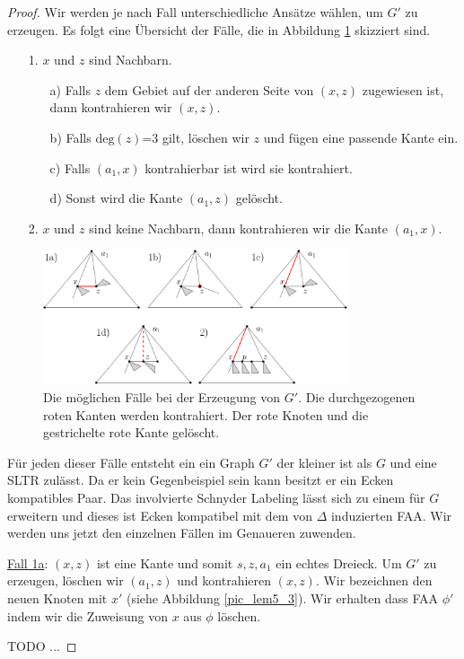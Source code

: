 \begin{proof}
Wir werden je nach Fall unterschiedliche Ansätze wählen, um $G'$ zu erzeugen. Es folgt eine Übersicht der Fälle, die in Abbildung \ref{pic_lem5_2} skizziert sind.

\begin{itemize}
\item [1.] $x$ und $z$ sind Nachbarn.
	\begin{itemize}
	\item [a)] Falls $z$ dem Gebiet auf der anderen Seite von $(x,z)$ zugewiesen ist, dann kontrahieren wir $(x,z)$.
	\item [b)] Falls $\text{deg}(z)$=3 gilt, löschen wir $z$ und fügen eine passende Kante ein.
	\item [c)] Falls $(a_1,x)$ kontrahierbar ist wird sie kontrahiert.
	\item [d)] Sonst wird die Kante $(a_1,z)$ gelöscht.
	\end{itemize}
\item [2.] $x$ und $z$ sind keine Nachbarn, dann kontrahieren wir die Kante $(a_1,x)$.
\end{itemize} 

\begin{figure}
	\centering
	  \includegraphics[width=0.8\textwidth]{lem5_2.png}
    	\caption{Die möglichen Fälle bei der Erzeugung von $G'$. Die durchgezogenen roten Kanten werden kontrahiert. Der rote Knoten und die gestrichelte rote Kante gelöscht.}
    	\label{pic_lem5_2}
\end{figure}

Für jeden dieser Fälle entsteht ein ein Graph $G'$ der kleiner ist als $G$ und eine SLTR zulässt. Da er kein Gegenbeispiel sein kann besitzt er ein Ecken kompatibles Paar. Das involvierte Schnyder Labeling lässt sich zu einem für $G$ erweitern und dieses ist Ecken kompatibel mit dem von $\Delta$ induzierten FAA. Wir werden uns jetzt den einzelnen Fällen im Genaueren zuwenden. 

\underline{Fall 1a}: $(x,z)$ ist eine Kante und somit $s,z,a_1$ ein echtes Dreieck. Um $G'$ zu erzeugen, löschen wir $(a_1,z)$ und kontrahieren $(x,z)$. Wir bezeichnen den neuen Knoten mit $x'$ (siehe Abbildung \ref{pic_lem5_3}). Wir erhalten dass FAA $\phi'$ indem wir die Zuweisung von $x$ aus $\phi$ löschen.



TODO ... 

\end{proof}